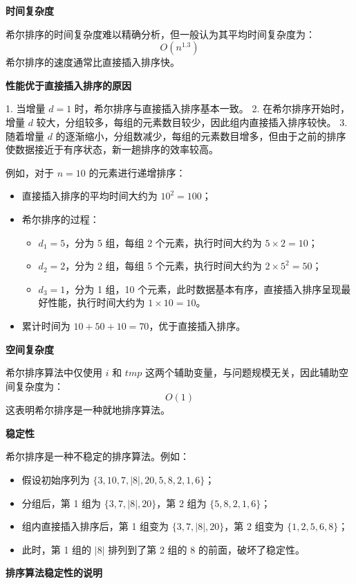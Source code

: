 \documentclass[lang=cn,newtx,10pt,scheme=chinese]{../elegantbook}
\begin{document}
\textbf{时间复杂度}  

希尔排序的时间复杂度难以精确分析，但一般认为其平均时间复杂度为：
\[
O(n^{1.3})
\]
希尔排序的速度通常比直接插入排序快。


\textbf{性能优于直接插入排序的原因}

1. 当增量 $d = 1$ 时，希尔排序与直接插入排序基本一致。
2. 在希尔排序开始时，增量 $d$ 较大，分组较多，每组的元素数目较少，因此组内直接插入排序较快。
3. 随着增量 $d$ 的逐渐缩小，分组数减少，每组的元素数目增多，但由于之前的排序使数据接近于有序状态，新一趟排序的效率较高。

例如，对于 $n = 10$ 的元素进行递增排序：
\begin{itemize}
  \item 直接插入排序的平均时间大约为 $10^2 = 100$；
  \item 希尔排序的过程：
    \begin{itemize}
      \item $d_1 = 5$，分为 5 组，每组 2 个元素，执行时间大约为 $5 \times 2 = 10$；
      \item $d_2 = 2$，分为 2 组，每组 5 个元素，执行时间大约为 $2 \times 5^2 = 50$；
      \item $d_3 = 1$，分为 1 组，10 个元素，此时数据基本有序，直接插入排序呈现最好性能，执行时间大约为 $1 \times 10 = 10$。
    \end{itemize}
  \item 累计时间为 $10 + 50 + 10 = 70$，优于直接插入排序。
\end{itemize}


\textbf{空间复杂度}  

希尔排序算法中仅使用 $i$ 和 $tmp$ 这两个辅助变量，与问题规模无关，因此辅助空间复杂度为：
\[
O(1)
\]
这表明希尔排序是一种就地排序算法。


\textbf{稳定性}  

希尔排序是一种不稳定的排序算法。例如：
\begin{itemize}
  \item 假设初始序列为 $\{3, 10, 7, |8|, 20, 5, 8, 2, 1, 6\}$；
  \item 分组后，第 1 组为 $\{3, 7, |8|, 20\}$，第 2 组为 $\{5, 8, 2, 1, 6\}$；
  \item 组内直接插入排序后，第 1 组变为 $\{3, 7, |8|, 20\}$，第 2 组变为 $\{1, 2, 5, 6, 8\}$；
  \item 此时，第 1 组的 $|8|$ 排列到了第 2 组的 $8$ 的前面，破坏了稳定性。
\end{itemize}


\textbf{排序算法稳定性的说明}
\end{document}
